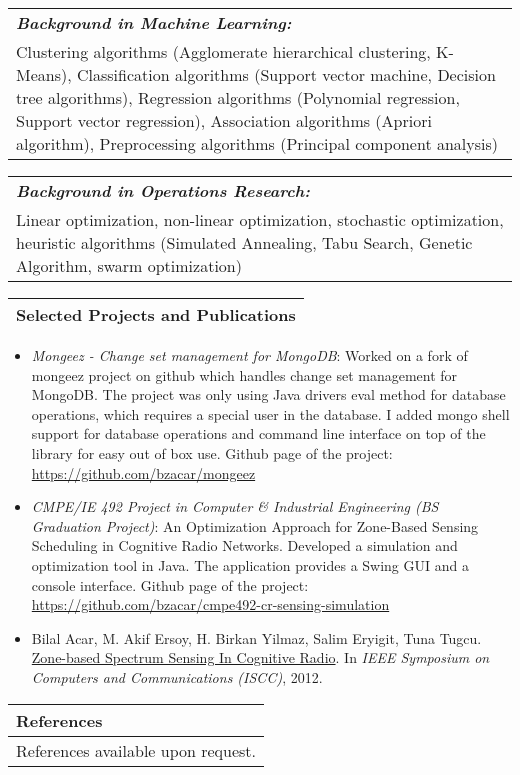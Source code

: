 \documentclass[11pt]{article}
\newcommand{\bigspace}{\vspace{0.4cm}}
\begin{document}
\bigspace

\begin{tabular}{p{18cm}}
\textit{\textbf{Background in Machine Learning:}}\\
Clustering algorithms (Agglomerate hierarchical clustering, K-Means), Classification algorithms (Support vector machine, Decision tree algorithms), Regression algorithms (Polynomial regression, Support vector regression), Association algorithms (Apriori algorithm), Preprocessing algorithms (Principal component analysis)
\end{tabular}


\begin{tabular}{p{18cm}}
\textit{\textbf{Background in Operations Research:}}\\
Linear optimization, non-linear optimization, stochastic optimization, heuristic algorithms (Simulated Annealing, Tabu Search, Genetic Algorithm, swarm optimization)
\end{tabular}

\bigspace
\begin{tabular}{p{18cm}}
\textbf{Selected Projects and Publications} \\
\hline
\end{tabular}

\begin{itemize}
\item \textit{Mongeez - Change set management for MongoDB}: Worked on a fork of mongeez project on github which handles change set management for MongoDB. The project was only using Java drivers eval method for database operations, which requires a special user in the database. I added mongo shell support for database operations and command line interface on top of the library for easy out of box use. Github page of the project: \url{https://github.com/bzacar/mongeez}
\item \textit{CMPE/IE 492 Project in Computer \& Industrial Engineering (BS Graduation Project)}: An Optimization Approach for Zone-Based Sensing Scheduling in Cognitive Radio Networks. Developed a simulation and optimization tool in Java. The application provides a Swing GUI and a console interface. Github page of the project: \url{https://github.com/bzacar/cmpe492-cr-sensing-simulation}
\item Bilal Acar, M. Akif Ersoy, H. Birkan Yilmaz, Salim Eryigit, Tuna Tugcu. \href{http://www.computer.org/csdl/proceedings/iscc/2012/2712/00/IS273.pdf}{Zone-based Spectrum Sensing In Cognitive Radio}. In \textit{IEEE Symposium on Computers and Communications (ISCC)}, 2012.
\end{itemize}

\begin{tabular}{p{18cm}}
\textbf{References} \\
\hline
\vspace{0.2cm}
References available upon request.
\end{tabular}
\end{document}
